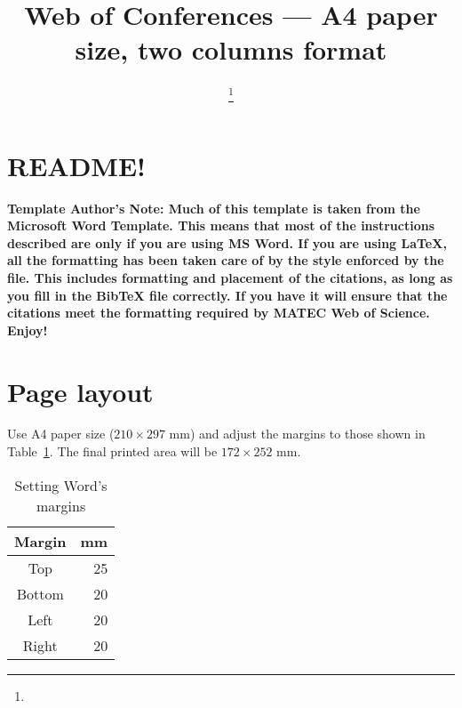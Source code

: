 \documentclass[twocolumn]{webofc}
\begin{document}
%
\title{Web of Conferences --- A4 paper size, two columns format}
%
%

\author{ \fnsep\thanks{} \and
         \and
         
      }


%
\maketitle
%
\section*{README!}\label{sec:readme}
\textbf{Template Author's Note:  Much of this template is taken from the Microsoft Word Template.
  This means that most of the instructions described are only if you are using MS Word.
  If you are using \LaTeX{}, all the formatting has been taken care of by the style enforced by the  file.
  This includes formatting and placement of the citations, as long as you fill in the BibTeX file  correctly.
  If you have  it will ensure that the citations meet the formatting required by MATEC Web of Science.
  Enjoy!
}
\section{Page layout}\label{sec:page-layout}
Use A4 paper size ($210 \times 297$ mm) and adjust the margins to those shown in Table~\ref{tab:word-margins}.
The final printed area will be $172 \times 252$ mm.

\begin{table}
  \centering
  \caption{Setting Word's margins}\label{tab:word-margins}
\begin{tabular}{cr}\toprule  %
  \textbf{Margin} &\textbf{mm}\\\midrule
  Top &25\\
  Bottom &20\\
  Left &20\\
  Right &20\\
  \bottomrule
\end{tabular}
\end{table}
\end{document}
